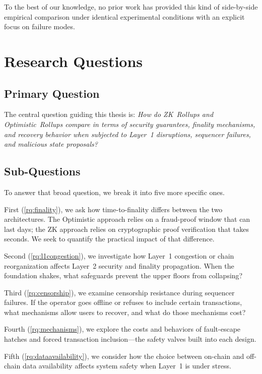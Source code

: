 \documentclass[
]{elteikthesis}[2024/04/26]
\begin{document}
To the best of our knowledge, no prior work has provided this kind of side-by-side empirical comparison under identical experimental conditions with an explicit focus on failure modes.

\section{Research Questions}

\subsection{Primary Question}

The central question guiding this thesis is: \textit{How do ZK~Rollups and Optimistic~Rollups compare in terms of security guarantees, finality mechanisms, and recovery behavior when subjected to Layer~1 disruptions, sequencer failures, and malicious state proposals?}

\subsection{Sub-Questions}

To answer that broad question, we break it into five more specific ones.

First (\ref{rq:finality}), \label{rq:finality} we ask how time-to-finality differs between the two architectures. The Optimistic approach relies on a fraud-proof window that can last days; the ZK approach relies on cryptographic proof verification that takes seconds. We seek to quantify the practical impact of that difference.

Second (\ref{rq:l1congestion}), \label{rq:l1congestion} we investigate how Layer~1 congestion or chain reorganization affects Layer~2 security and finality propagation. When the foundation shakes, what safeguards prevent the upper floors from collapsing?

Third (\ref{rq:censorship}), \label{rq:censorship} we examine censorship resistance during sequencer failures. If the operator goes offline or refuses to include certain transactions, what mechanisms allow users to recover, and what do those mechanisms cost?

Fourth (\ref{rq:mechanisms}), \label{rq:mechanisms} we explore the costs and behaviors of fault-escape hatches and forced transaction inclusion---the safety valves built into each design.

Fifth (\ref{rq:dataavailability}), \label{rq:dataavailability} we consider how the choice between on-chain and off-chain data availability affects system safety when Layer~1 is under stress.
\end{document}
